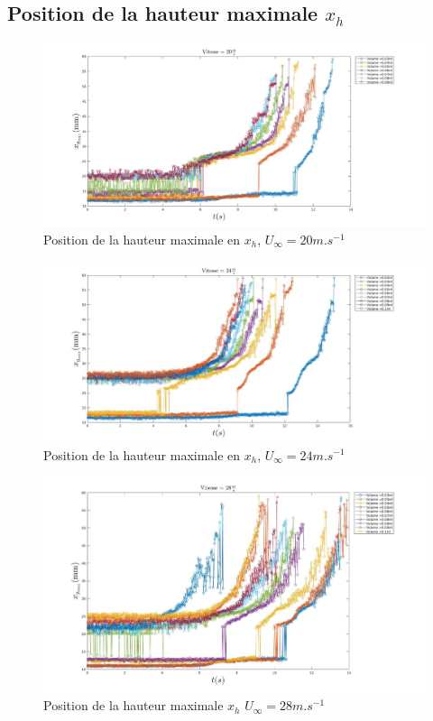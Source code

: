 \documentclass[french]{article}
\begin{document}
\subsection{Position de la hauteur maximale $x_{h}$}

\begin{figure}[h]
	\centering
	\includegraphics[width = \linewidth]{./image/v=20xm.jpg}
	\caption{Position de la hauteur maximale en $x_{h}$, $U_{\infty}=20m.s^{-1}$}
\end{figure}

\begin{figure}[h]
	\centering
	\includegraphics[width = \linewidth]{./image/v=24xm.jpg}
	\caption{Position de la hauteur maximale en $x_{h}$, $U_{\infty}=24m.s^{-1}$}
\end{figure}


\begin{figure}[h]
	\centering
	\includegraphics[width = \linewidth]{./image/v=28xm.jpg}
	\caption{Position de la hauteur maximale $x_{h}$ $U_{\infty}=28m.s^{-1}$}
\end{figure}
\end{document}
